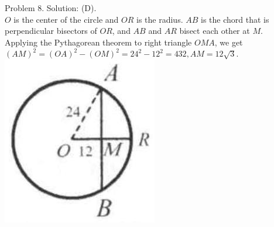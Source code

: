 \documentclass[10pt]{article}
\begin{document}
Problem 8. Solution: (D).\\
\(O\) is the center of the circle and \(O R\) is the radius. \(A B\) is the chord that is perpendicular bisectors of \(O R\), and \(A B\) and \(A R\) bisect each other at \(M\).\\
Applying the Pythagorean theorem to right triangle \(O M A\), we get \((A M)^{2}=(O A)^{2}-(O M)^{2}=24^{2}-12^{2}=432, A M=12 \sqrt{3}\).\\
\includegraphics[max width=\textwidth, center]{2025_04_17_97bc1f7e44d93c271a88g-159(1)}
\end{document}
